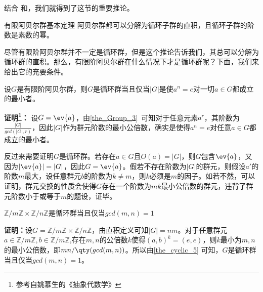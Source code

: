 结合 和，我们就得到了这节的重要推论。

\begin{corollary}{有限阿贝尔群基本定理}
阿贝尔群都可以分解为循环子群的直积，且循环子群的阶数是素数的幂。
\end{corollary}
尽管有限阶阿贝尔群并不一定是循环群，但是这个推论告诉我们，其总可以分解为循环群的直积。那么，有限阶阿贝尔群在什么情况下才是循环群呢？下面，我们来给出它的充要条件。
\begin{theorem}{}\label{the_cyclic_5}
设$G$是有限阶阿贝尔群，则$G$是循环群当且仅当$|G|$是使$a^n=e$对一切$a\in G$都成立的最小者。
\end{theorem}

\textbf{证明\footnote{参考自姚慕生的《抽象代数学》}：}
设$G=\ev{a}$，由\autoref{the_Group_3}~可知对于任意元素$a^r$，其阶数为$\frac{|G|}{gcd(|G|,r)}$，因此$|G|$作为群元阶数的最小公倍数，确实是使得$a^n=e$对任意$a\in G$都成立的最小者。

反过来需要证明$G$是循环群。若存在$a\in G$且$O(a)=|G|$，则$G$包含$\ev{a}$，又因为$|\ev{a}|=|G|$，因此$G=\ev{a}$。假若不存在阶数为$|G|$的群元，则假设$a'$的阶数$m$最大，设任意群元$b$的阶数为$k\neq m$，则$k$必须是$m$的因子。如若不然，可以证明，群元交换的性质会使得$G$存在一个阶数为$mk$最小公倍数的群元，违背了群元阶数小于或等于$m$的题设，证毕。

\begin{corollary}{}
$\mathbb{Z} / m \mathbb{Z} \times \mathbb{Z} / n \mathbb{Z}$是循环群当且仅当$gcd(m,n)=1$
\end{corollary}
\textbf{证明：}设$G=\mathbb{Z} / m \mathbb{Z} \times \mathbb{Z} / n \mathbb{Z}$，由直积定义可知$|G|=mn$。对于任意群元$a\in \mathbb{Z} / m \mathbb{Z},b\in \mathbb{Z} / m \mathbb{Z}$,存在$m,n$的公倍数$k$使得$(a,b)^k=(e,e)$，则$k$最小为$m,n$的最小公倍数，即$mn/\qty(gcd(m,n))$。所以由\autoref{the_cyclic_5}  可知，$G$是循环群当且仅当$gcd(m,n)=1$。